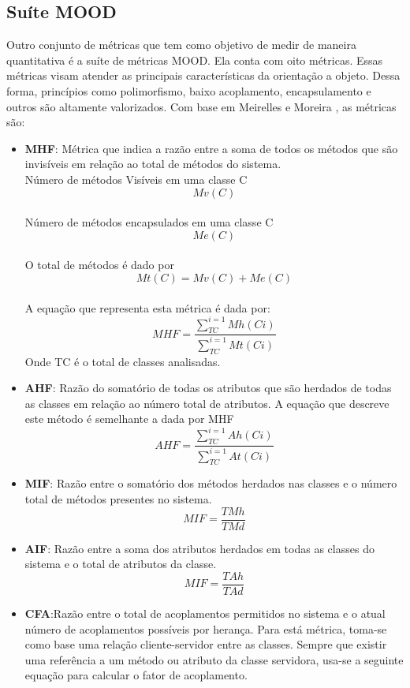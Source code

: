 \subsection{Suíte MOOD}
Outro conjunto de métricas que tem como objetivo de medir de maneira quantitativa é a suíte de métricas MOOD. Ela conta com oito métricas. Essas métricas visam atender as principais características da orientação a objeto. Dessa forma, princípios como polimorfismo, baixo acoplamento, encapsulamento e outros são altamente valorizados. Com base em Meirelles \cite{paulo_meirelles} e Moreira \cite{moreira_avaliacao_2015}, as métricas são:
\begin{itemize}
\item \textbf{MHF}: Métrica que indica a razão entre a soma de todos os métodos que são invisíveis em relação ao total de métodos do sistema.
\\Número de métodos Visíveis em uma classe C
\begin{equation}
Mv(C)
\end{equation}
\\Número de métodos encapsulados em uma classe C
\begin{equation}
Me(C)
\end{equation}
\\O total de métodos é dado por
\begin{equation}
Mt(C) = Mv(C)+Me(C)
\end{equation}
\\A equação que representa esta métrica é dada por:
\begin{equation}
MHF =\frac{\sum_{TC}^{i=1}Mh(Ci)}{\sum_{TC}^{i=1}Mt(Ci)}
\end{equation}
Onde TC é o total de classes analisadas.

\item \textbf{AHF}: Razão do somatório de todas os atributos que são herdados de todas as classes em relação ao número total de atributos. A equação que descreve este método é semelhante a dada por MHF
\begin{equation}
AHF =\frac{\sum_{TC}^{i=1}Ah(Ci)}{\sum_{TC}^{i=1}At(Ci)}
\end{equation}

\item \textbf{MIF}: Razão entre o somatório dos métodos herdados nas classes e o número total de métodos presentes no sistema.
\begin{equation}
MIF = \frac{TMh}{TMd}
\end{equation}
\item \textbf{AIF}: Razão entre a soma dos atributos herdados em todas as classes do sistema e o total de atributos da classe.
\begin{equation}
MIF = \frac{TAh}{TAd}
\end{equation}
\item \textbf{CFA}:Razão entre o total de acoplamentos permitidos no sistema e o atual número de acoplamentos possíveis por herança. Para está métrica, toma-se como base uma relação cliente-servidor entre as classes. Sempre que existir uma referência a um método ou atributo da classe servidora, usa-se a seguinte equação para calcular o fator de acoplamento.


\end{itemize}
